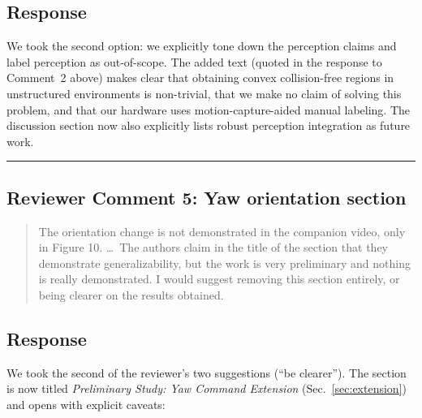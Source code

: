 \subsection{Response}
We took the second option: we explicitly tone down the perception claims and label perception as out-of-scope. The added text (quoted in the response to Comment~2 above) makes clear that obtaining convex collision-free regions in unstructured environments is non-trivial, that we make no claim of solving this problem, and that our hardware uses motion-capture-aided manual labeling. The discussion section now also explicitly lists robust perception integration as future work.

\noindent\rule{17cm}{2.0pt}

\subsection{Reviewer Comment 5: Yaw orientation section}
\begin{mdframed}
\begin{quote}
The orientation change is not demonstrated in the companion video, only in Figure 10. \ldots\ The authors claim in the title of the section that they demonstrate generalizability, but the work is very preliminary and nothing is really demonstrated. I would suggest removing this section entirely, or being clearer on the results obtained.
\end{quote}
\end{mdframed}

\subsection{Response}
We took the second of the reviewer's two suggestions (``be clearer''). The section is now titled \textit{Preliminary Study: Yaw Command Extension} (Sec.~\ref{sec:extension}) and opens with explicit caveats:

\textit{}

